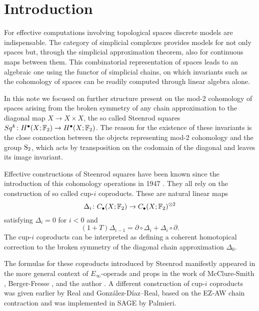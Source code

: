 
\section{Introduction}

For effective computations involving topological spaces discrete models are indispensable.
The category of simplicial complexes provides models for not only spaces but, through the simplicial approximation theorem, also for continuous maps between them.
This combinatorial representation of spaces leads to an algebraic one using the functor of simplicial chains, on which invariants such as the cohomology of spaces can be readily computed through linear algebra alone.

In this note we focused on further structure present on the mod-2 cohomology of spaces arising from the broken symmetry of any chain approximation to the diagonal map $X \to X \times X$, the so called Steenrod squares $Sq^k \colon H^\bullet(X; \F_2) \to H^\bullet(X; \F_2)$.
The reason for the existence of these invariants is the close connection between the objects representing mod-2 cohomology and the group $\S_2$, which acts by transposition on the codomain of the diagonal and leaves its image invariant.

Effective constructions of Steenrod squares have been known since the introduction of this cohomology operations in 1947 \cite{steenrod47}.
They all rely on the construction of so called cup-$i$ coproducts.
These are natural linear maps
\begin{equation*}
\Delta_i \colon \chains(X; \F_2)  \to \chains(X; \F_2)^{\otimes 2}
\end{equation*}
satisfying $\Delta_i = 0$ for $i < 0$ and
\begin{equation*}
(1 + T) \Delta_{i-1} = \partial \circ \Delta_i + \Delta_i \circ \partial.
\end{equation*}
The cup-$i$ coproducts can be interpreted as defining a coherent homotopical correction to the broken symmetry of the diagonal chain approximation $\Delta_0$.

The formulas for these coproducts introduced by Steenrod manifestly appeared in the more general context of $E_\infty$-operads and props in the work of McClure-Smith \cite{mcclure03cochain}, Berger-Fresse \cite{berger04combinatorial}, and the author \cite{medina2020prop1,medina2018prop2}.
A different construction of cup-$i$ coproducts was given earlier by Real and Gonz\'alez-D\'iaz--Real, based on the EZ-AW chain contraction and was implemented in SAGE by Palmieri.

